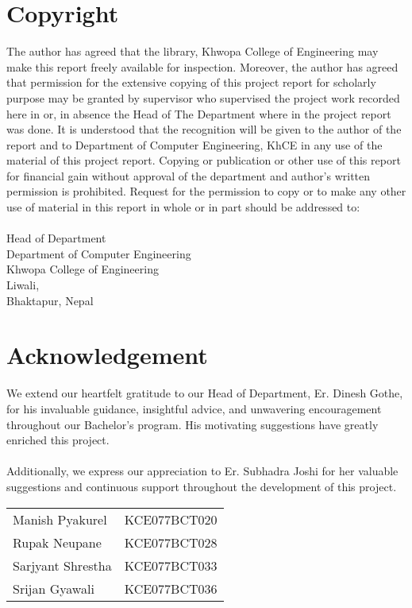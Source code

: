 \large
	\chapter*{Copyright}
\normalsize
{}
	The author has agreed that the library, Khwopa College of Engineering  may make this report freely available for inspection. Moreover, the author has agreed that permission for the extensive copying of this project report for scholarly purpose may be granted by supervisor who supervised the project work recorded here in or, in absence the Head of The Department where in the project report was done. It is understood that the recognition will be given to the author of the report and to Department of Computer Engineering, KhCE in any use of the material of this project report. Copying or publication or other use of this report for financial gain without approval of the department and author’s written permission is prohibited. Request for the permission to copy or to make any other use of material in this report in whole or in part should be addressed to: \\
	\vspace{1cm} \\
	Head of Department \\
	Department of Computer Engineering\\
	Khwopa College of Engineering\\
	Liwali,\\
	Bhaktapur, Nepal\\
\pagebreak


\large
\chapter*{Acknowledgement}
\normalsize
{}
We extend our heartfelt gratitude to our Head of Department, Er. Dinesh Gothe, for his invaluable guidance, insightful advice, and unwavering encouragement throughout our Bachelor's program. His motivating suggestions have greatly enriched this project.\\\\
Additionally, we express our appreciation to Er. Subhadra Joshi for her valuable suggestions and continuous support throughout the development of this project.
\begin{table}[h]
	\begin{tabular}{@{}ll}
		Manish Pyakurel    & KCE077BCT020 \\
		Rupak Neupane      & KCE077BCT028 \\
		Sarjyant Shrestha  & KCE077BCT033 \\
		Srijan Gyawali     & KCE077BCT036 \\
	\end{tabular}
\end{table}
\pagebreak

